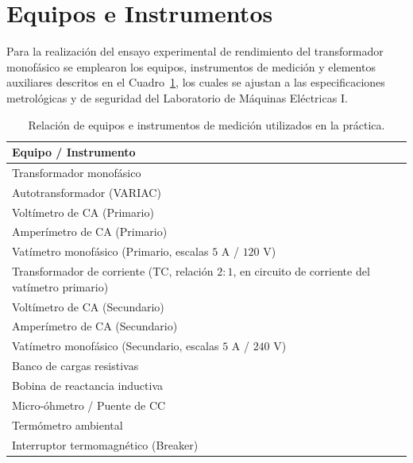 \section{Equipos e Instrumentos}

Para la realización del ensayo experimental de rendimiento del transformador monofásico se emplearon los equipos, instrumentos de medición y elementos auxiliares descritos en el Cuadro~\ref{tab:equipos_instrumentos}, los cuales se ajustan a las especificaciones metrológicas y de seguridad del Laboratorio de Máquinas Eléctricas I.

\begin{table}[htbp]
    \centering
    \caption{Relación de equipos e instrumentos de medición utilizados en la práctica.}
    \label{tab:equipos_instrumentos}
    \begin{tabular}{l}
        \toprule
        \textbf{Equipo / Instrumento} \\
        \midrule
        Transformador monofásico \\
        Autotransformador (VARIAC) \\
        Voltímetro de CA (Primario) \\
        Amperímetro de CA (Primario) \\
        Vatímetro monofásico (Primario, escalas $5\text{ A}$ / $120\text{ V}$) \\
        Transformador de corriente (TC, relación $2:1$, en circuito de corriente del vatímetro primario) \\
        Voltímetro de CA (Secundario) \\
        Amperímetro de CA (Secundario) \\
        Vatímetro monofásico (Secundario, escalas $5\text{ A}$ / $240\text{ V}$) \\
        Banco de cargas resistivas \\
        Bobina de reactancia inductiva \\
        Micro-óhmetro / Puente de CC \\
        Termómetro ambiental \\
        Interruptor termomagnético (Breaker) \\
        \bottomrule
    \end{tabular}
\end{table}
